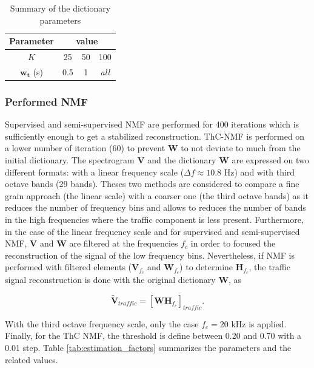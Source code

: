 \documentclass[twocolumn,a4paper,10pt]{article}
\begin{document}
\begin{table}[h]
\centering
\begin{tabular}{cccc}
Parameter &  \multicolumn{3}{c}{value}\\ \hline
$K$ & 25  & 50 & 100 \\ \hline
$\mathbf{w_t}$ (s)& 0.5 & 1  & \textit{all}
\end{tabular}
\caption{Summary of the dictionary parameters}
\label{tab:dictionary_factors}
\end{table} 

\subsubsection{Performed NMF}

Supervised and semi-supervised NMF are performed for 400 iterations which is sufficiently enough to get a stabilized reconstruction. ThC-NMF is performed on a lower number of iteration (60) to prevent $\mathbf{W}$ to not deviate to much from the initial dictionary. The spectrogram $\mathbf{V}$ and the dictionary $\mathbf{W}$ are expressed on two different formats: with a linear frequency scale ($\Delta f \approx 10.8$ Hz) and with third octave bands (29 bands). Theses two methods are considered to compare a fine grain approach (the linear scale) with a coarser one (the third octave bands) as it reduces the number of frequency bins and allows to reduces the number of bands in the high frequencies where the traffic component is less present.  Furthermore, in the case of the linear frequency scale and for supervised and semi-supervised NMF, $\mathbf{V}$ and $\mathbf{W}$ are filtered at the frequencies $f_c$ in order to focused the reconstruction of the signal of the low frequency bins. Nevertheless, if NMF is performed with filtered elements ($\mathbf{V}_{f_c}$ and $\mathbf{W}_{f_c}$) to determine $\mathbf{H}_{f_c}$, the traffic signal reconstruction is done with the original dictionary $\mathbf{W}$, as

\begin{equation}
\mathbf{\tilde{V}}_{traffic} = \left[\mathbf{WH}_{f_c}\right]_{traffic}.
\end{equation}

With the third octave frequency scale, only the case $f_c = 20$ kHz is applied. Finally, for the ThC NMF, the threshold is define between 0.20 and 0.70 with a 0.01 step. Table \ref{tab:estimation_factors} summarizes the parameters and the related values.
\end{document}
